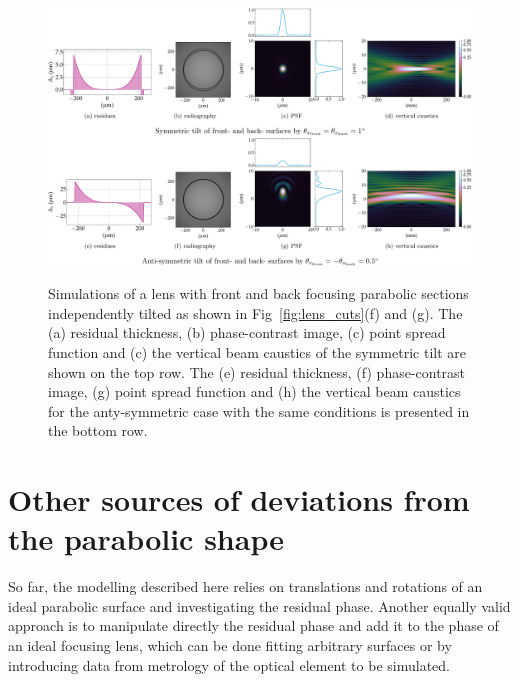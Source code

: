 \begin{refsection}
\begin{figure}[t]
        \centering
        {\includegraphics[width=1.\linewidth]{figures/compressed/tilt_fs_CRL.pdf}}
        \caption[Effects of the tilted parabolic section]{Simulations of a lens with front and back focusing parabolic sections independently tilted as shown in Fig~\ref{fig:lens_cuts}(f) and (g). The (a) residual thickness, (b) phase-contrast image, (c) point spread function and (c) the vertical beam caustics of the symmetric tilt are shown on the top row. The (e) residual thickness, (f) phase-contrast image, (g) point spread function and (h) the vertical beam caustics for the anty-symmetric case with the same conditions is presented in the bottom row.} \label{fig:tilt_fs_CRL}
\end{figure}
\section{Other sources of deviations from the parabolic shape}\label{sec:other_sources}

So far, the modelling described here relies on translations and rotations of an ideal parabolic surface and investigating the residual phase. Another equally valid approach is to manipulate directly the residual phase and add it to the phase of an ideal focusing lens, which can be done fitting arbitrary surfaces or by introducing data from metrology of the optical element to be simulated.


\end{refsection}
